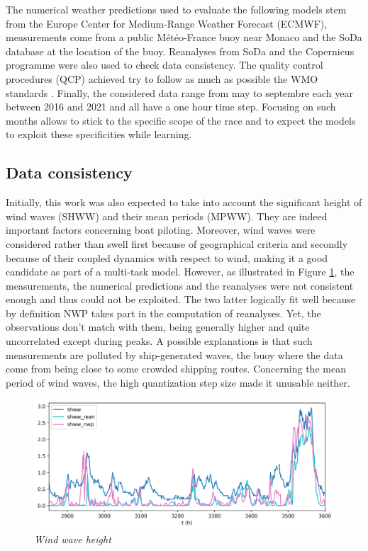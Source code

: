 \documentclass{article}
\newcommand{\saut}{\vspace{10px}}
\begin{document}
\saut

The numerical weather predictions used to evaluate the following models 
stem from the Europe Center for Medium-Range Weather Forecast (ECMWF), measurements come from a public
Météo-France buoy near Monaco and the SoDa database at the location of the buoy. Reanalyses from SoDa and
the Copernicus programme were also used to check data consistency. The quality control procedures (QCP) achieved
try to follow as much as possible the WMO standards \cite{organization_wmo_guidelines_2021}. Finally,
the considered data range from may to septembre each year between 2016 and 2021 and all have a one hour
time step. Focusing on such months allows to stick to the specific scope of the race and to expect the models
to exploit these specificities while learning.

\subsection*{Data consistency}

Initially, this work was also expected to take into account the significant height of wind waves (SHWW)
and their mean periods (MPWW).
They are indeed important factors concerning boat piloting. Moreover, wind waves were considered rather than swell
first because of geographical criteria and secondly because of their coupled dynamics with respect to wind, making it
a good candidate as part of a multi-task model. However, as illustrated in Figure \ref{shww}, the measurements, the
numerical predictions and the reanalyses were not consistent enough and thus could not be exploited. The two
latter logically fit well because by definition NWP takes part in the computation of reanalyses. Yet, the observations
don't match with them, being generally higher and quite uncorrelated except during peaks.
A possible explanations is that such measurements
are polluted by ship-generated waves, the buoy where the data come from being close to some crowded shipping
routes. Concerning the mean period of wind waves, the high quantization step size made it unusable neither.

\saut

\begin{figure}[H]
    \centering
    \includegraphics[width=.95\linewidth]{img/shww.png}
    \caption{\textit{Wind wave height}}
   \label{shww}
\end{figure}
\end{document}
